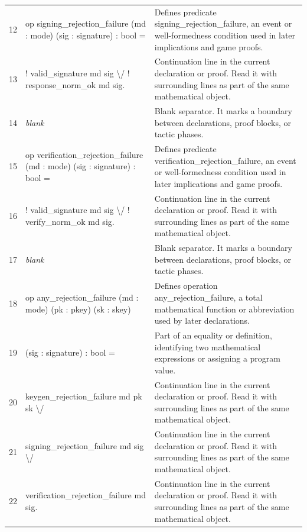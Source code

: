 \documentclass[10pt]{article}
\begin{document}
\begin{longtable}{r L{0.53\textwidth} L{0.37\textwidth}}
12 & {\ttfamily\scriptsize op signing\_rejection\_failure (md : mode) (sig : signature) : bool =} & Defines predicate signing\_rejection\_failure, an event or well-formedness condition used in later implications and game proofs. \\
13 & {\ttfamily\scriptsize   ! valid\_signature md sig \textbackslash{}/ ! response\_norm\_ok md sig.} & Continuation line in the current declaration or proof.  Read it with surrounding lines as part of the same mathematical object. \\
14 & {\ttfamily\scriptsize \emph{blank}} & Blank separator.  It marks a boundary between declarations, proof blocks, or tactic phases. \\
15 & {\ttfamily\scriptsize op verification\_rejection\_failure (md : mode) (sig : signature) : bool =} & Defines predicate verification\_rejection\_failure, an event or well-formedness condition used in later implications and game proofs. \\
16 & {\ttfamily\scriptsize   ! valid\_signature md sig \textbackslash{}/ ! verify\_norm\_ok md sig.} & Continuation line in the current declaration or proof.  Read it with surrounding lines as part of the same mathematical object. \\
17 & {\ttfamily\scriptsize \emph{blank}} & Blank separator.  It marks a boundary between declarations, proof blocks, or tactic phases. \\
18 & {\ttfamily\scriptsize op any\_rejection\_failure (md : mode) (pk : pkey) (sk : skey)} & Defines operation any\_rejection\_failure, a total mathematical function or abbreviation used by later declarations. \\
19 & {\ttfamily\scriptsize                          (sig : signature) : bool =} & Part of an equality or definition, identifying two mathematical expressions or assigning a program value. \\
20 & {\ttfamily\scriptsize   keygen\_rejection\_failure md pk sk \textbackslash{}/} & Continuation line in the current declaration or proof.  Read it with surrounding lines as part of the same mathematical object. \\
21 & {\ttfamily\scriptsize   signing\_rejection\_failure md sig \textbackslash{}/} & Continuation line in the current declaration or proof.  Read it with surrounding lines as part of the same mathematical object. \\
22 & {\ttfamily\scriptsize   verification\_rejection\_failure md sig.} & Continuation line in the current declaration or proof.  Read it with surrounding lines as part of the same mathematical object. \\

\end{longtable}
\end{document}
